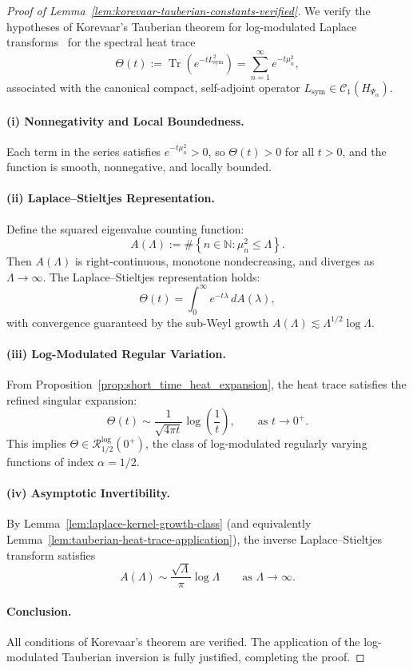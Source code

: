 \begin{proof}[Proof of Lemma~\ref{lem:korevaar-tauberian-constants-verified}]
We verify the hypotheses of Korevaar’s Tauberian theorem for log-modulated Laplace transforms~\cite[Ch.~III, Thm.~5.5]{Korevaar2004Tauberian} for the spectral heat trace
\[
\Theta(t) := \operatorname{Tr}(e^{-t L_{\mathrm{sym}}^2}) = \sum_{n=1}^\infty e^{-t \mu_n^2},
\]
associated with the canonical compact, self-adjoint operator \( L_{\mathrm{sym}} \in \mathcal{C}_1(H_{\Psi_\alpha}) \).

\paragraph{(i) Nonnegativity and Local Boundedness.}
Each term in the series satisfies \( e^{-t \mu_n^2} > 0 \), so \( \Theta(t) > 0 \) for all \( t > 0 \), and the function is smooth, nonnegative, and locally bounded.

\paragraph{(ii) Laplace–Stieltjes Representation.}
Define the squared eigenvalue counting function:
\[
A(\Lambda) := \#\left\{ n \in \mathbb{N} : \mu_n^2 \le \Lambda \right\}.
\]
Then \( A(\Lambda) \) is right-continuous, monotone nondecreasing, and diverges as \( \Lambda \to \infty \). The Laplace–Stieltjes representation holds:
\[
\Theta(t) = \int_0^\infty e^{-t \lambda} \, dA(\lambda),
\]
with convergence guaranteed by the sub-Weyl growth \( A(\Lambda) \lesssim \Lambda^{1/2} \log \Lambda \).

\paragraph{(iii) Log-Modulated Regular Variation.}
From Proposition~\ref{prop:short_time_heat_expansion}, the heat trace satisfies the refined singular expansion:
\[
\Theta(t) \sim \frac{1}{\sqrt{4\pi t}} \log\left( \frac{1}{t} \right), \qquad \text{as } t \to 0^+.
\]
This implies \( \Theta \in \mathcal{R}^{\log}_{1/2}(0^+) \), the class of log-modulated regularly varying functions of index \( \alpha = 1/2 \).

\paragraph{(iv) Asymptotic Invertibility.}
By Lemma~\ref{lem:laplace-kernel-growth-class} (and equivalently Lemma~\ref{lem:tauberian-heat-trace-application}), the inverse Laplace–Stieltjes transform satisfies
\[
A(\Lambda) \sim \frac{\sqrt{\Lambda}}{\pi} \log \Lambda \qquad \text{as } \Lambda \to \infty.
\]

\paragraph{Conclusion.}
All conditions of Korevaar’s theorem are verified. The application of the log-modulated Tauberian inversion is fully justified, completing the proof.
\end{proof}
